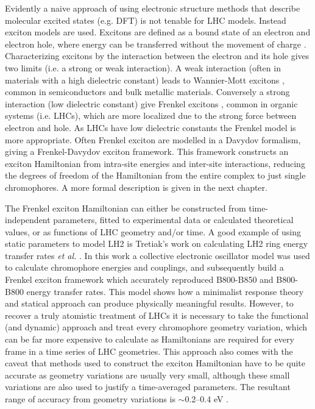 Evidently a naive approach of using electronic structure methods that describe molecular
excited states (e.g. DFT) is not tenable for LHC models. Instead exciton models 
are used. Excitons are defined as a bound state of an electron and electron hole,
where energy can be transferred without the movement of charge \cite{Craig1968, Scholes2006}.
Characterizing excitons by the interaction between the electron and its hole gives
two limits (i.e. a strong or weak interaction). A weak interaction (often in materials
with a high dielectric constant) leads to Wannier-Mott excitons \cite{Wannier1937},
common in semiconductors and bulk metallic materials. Conversely a strong interaction
(low dielectric constant) give Frenkel excitons \cite{Frenkel1931}, common in organic
systems (i.e. LHCs), which are more localized due to the strong force between electron 
and hole. As LHCs have low dielectric constants the Frenkel model is more appropriate.
Often Frenkel exciton are modelled in a Davydov formalism, giving a Frenkel-Davydov 
exciton framework\cite{Davydov1964}. This framework constructs an exciton Hamiltonian 
from intra-site energies and inter-site interactions, reducing the degrees of freedom
of the Hamiltonian from the entire complex to just single chromophores. A more formal
description is given in the next chapter.

The Frenkel exciton Hamiltonian can either be constructed from time-independent
parameters, fitted to experimental data or calculated theoretical values, or as 
functions of LHC geometry and/or time. A good example of using static parameters 
to model LH2 is Tretiak's work on calculating LH2 ring energy transfer rates \emph{et al.} \cite{Tretiak2000}.
In this work a collective electronic oscillator model was used to calculate chromophore 
energies and couplings, and subsequently build a Frenkel exciton framework which
accurately reproduced B800-B850 and B800-B800 energy transfer rates. This model 
shows how a minimalist response theory and statical approach can produce physically
meaningful results. However, to recover a truly atomistic treatment of LHCs it is
necessary to take the functional (and dynamic) approach and treat every chromophore
geometry variation, which can be far more expensive to calculate as Hamiltonians 
are required for every frame in a time series of LHC geometries. This approach also
comes with the caveat that methods used to construct the exciton Hamiltonian have 
to be quite accurate as geometry variations are usually very small, although these
small variations are also used to justify a time-averaged parameters. The resultant
range of accuracy from geometry variations is $\sim$0.2--0.4 eV \cite{Renger2013, Hansen2019}.

